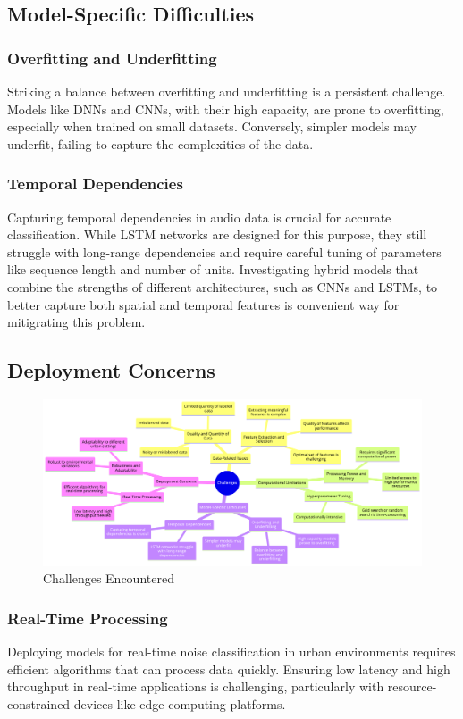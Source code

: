 \documentclass[conference]{IEEEtran}
\begin{document}
\subsection{Model-Specific Difficulties}

\subsubsection{Overfitting and Underfitting}
Striking a balance between overfitting and underfitting is a persistent challenge. Models like DNNs and CNNs, with their high capacity, are prone to overfitting, especially when trained on small datasets. Conversely, simpler models may underfit, failing to capture the complexities of the data.

\subsubsection{Temporal Dependencies}
Capturing temporal dependencies in audio data is crucial for accurate classification. While LSTM networks are designed for this purpose, they still struggle with long-range dependencies and require careful tuning of parameters like sequence length and number of units. Investigating hybrid models that combine the strengths of different architectures, such as CNNs and LSTMs, to better capture both spatial and temporal features is convenient way for mitigrating this problem.

\subsection{Deployment Concerns}

\begin{figure}[htbp]
\centering
\includegraphics[width=\textwidth]{Images/challenges.png}
\caption{Challenges Encountered}
\label{fig:challenges}
\end{figure}

\subsubsection{Real-Time Processing}
Deploying models for real-time noise classification in urban environments requires efficient algorithms that can process data quickly. Ensuring low latency and high throughput in real-time applications is challenging, particularly with resource-constrained devices like edge computing platforms.
\end{document}
